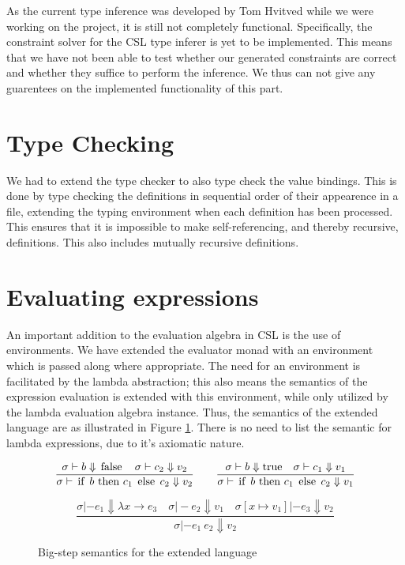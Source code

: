 \documentclass[10pt,a4paper,final,oneside,openany,article]{memoir}
\newcommand{\kw}[1]{\text{\lstinline{#1}}}
\begin{document}
As the current type inference was developed by Tom Hvitved while we
were working on the project, it is still not completely
functional. Specifically, the constraint solver for the CSL type
inferer is yet to be implemented. This means that we have not been
able to test whether our generated constraints are correct and whether
they suffice to perform the inference. We thus can not give any
guarentees on the implemented functionality of this part.


\section{Type Checking}
We had to extend the type checker to also type check the value
bindings.  This is done by type checking the definitions in sequential
order of their appearence in a file, extending the typing environment
when each definition has been processed. This ensures that it is
impossible to make self-referencing, and thereby recursive,
definitions.  This also includes mutually recursive definitions.

\section{Evaluating expressions}
An important addition to the evaluation algebra in CSL is the use of
environments. We have extended the evaluator monad with an environment
which is passed along where appropriate. The need for an environment is
facilitated by the lambda abstraction; this also means the semantics of
the expression evaluation is extended with this environment, while only
utilized by the lambda evaluation algebra instance. Thus, the semantics
of the extended language are as illustrated in Figure
\ref{fig:bigstep_semantics}. There is no need to list the semantic for
lambda expressions, due to it's axiomatic nature.

\begin{figure}
\begin{equation*}
\frac{
  \sigma |- b \Downarrow \kw{false}
  \quad \sigma |- c_2 \Downarrow v_2
}{
  \sigma |- \kw{if} ~b ~\kw{then} ~c_1 ~\kw{else} ~c_2 \Downarrow v_2
}
\quad \quad
\frac{
  \sigma |- b \Downarrow \kw{true}
  \quad \sigma |- c_1 \Downarrow v_1
}{
  \sigma |- \kw{if} ~b ~\kw{then} ~c_1 ~\kw{else} ~c_2 \Downarrow v_1
}\label{eq:eval_condition}
\end{equation*}

\begin{equation*}
\frac{
  \sigma |- e_1 \Downarrow \lambda x \rightarrow e_3
  \quad \sigma |- e_2 \Downarrow v_1
  \quad \sigma[x\mapsto v_1] |- e_3 \Downarrow v_2
}{
  \sigma |- e_1 ~e_2 \Downarrow v_2
}\label{eq:eval_apply}
\end{equation*}

\caption{Big-step semantics for the extended language}
\label{fig:bigstep_semantics}
\end{figure}
\end{document}
